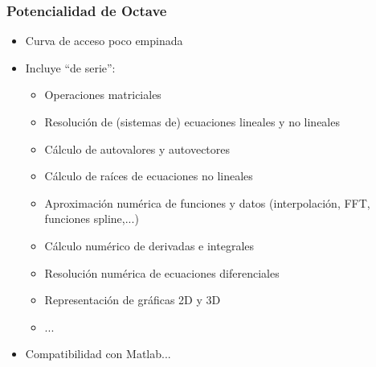 
\hypertarget{potencialidad-de-octave}{}
\begin{frame}\frametitle{Potencialidad de Octave}
\begin{itemize}
\item {} 
Curva de acceso poco empinada

\item {} 
Incluye ``de serie'':
\begin{itemize}
\item {} 
Operaciones matriciales

\item {} 
Resolución de (sistemas de) ecuaciones lineales y no lineales

\item {} 
Cálculo de autovalores y autovectores

\item {} 
Cálculo de raíces de ecuaciones no lineales

\item {} 
Aproximación numérica de funciones y datos (interpolación,
FFT, funciones spline,...)

\item {} 
Cálculo numérico de derivadas e integrales

\item {} 
Resolución numérica de ecuaciones diferenciales

\item {} 
Representación de gráficas 2D y 3D 

\item {} 
...

\end{itemize}

\item Compatibilidad con Matlab...

\end{itemize}

\end{frame}



